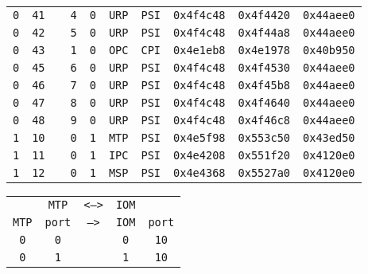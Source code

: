 \begin{adjustwidth}{5ex}{1ex}
\begin{tabular}{cccccccccc}
		\texttt{0} & \texttt{41} & & \texttt{4} & \texttt{0} & \texttt{URP} & \texttt{PSI} & \texttt{0x4f4c48} & \texttt{0x4f4420} & \texttt{0x44aee0} \\
		\texttt{0} & \texttt{42} & & \texttt{5} & \texttt{0} & \texttt{URP} & \texttt{PSI} & \texttt{0x4f4c48} & \texttt{0x4f44a8} & \texttt{0x44aee0} \\
		\texttt{0} & \texttt{43} & & \texttt{1} & \texttt{0} & \texttt{OPC} & \texttt{CPI} & \texttt{0x4e1eb8} & \texttt{0x4e1978} & \texttt{0x40b950} \\
		\texttt{0} & \texttt{45} & & \texttt{6} & \texttt{0} & \texttt{URP} & \texttt{PSI} & \texttt{0x4f4c48} & \texttt{0x4f4530} & \texttt{0x44aee0} \\
		\texttt{0} & \texttt{46} & & \texttt{7} & \texttt{0} & \texttt{URP} & \texttt{PSI} & \texttt{0x4f4c48} & \texttt{0x4f45b8} & \texttt{0x44aee0} \\
		\texttt{0} & \texttt{47} & & \texttt{8} & \texttt{0} & \texttt{URP} & \texttt{PSI} & \texttt{0x4f4c48} & \texttt{0x4f4640} & \texttt{0x44aee0} \\
		\texttt{0} & \texttt{48} & & \texttt{9} & \texttt{0} & \texttt{URP} & \texttt{PSI} & \texttt{0x4f4c48} & \texttt{0x4f46c8} & \texttt{0x44aee0} \\
        \texttt{1} & \texttt{10} & & \texttt{0} & \texttt{1} & \texttt{MTP} & \texttt{PSI} & \texttt{0x4e5f98} & \texttt{0x553c50} & \texttt{0x43ed50} \\
		\texttt{1} & \texttt{11} & & \texttt{0} & \texttt{1} & \texttt{IPC} & \texttt{PSI} & \texttt{0x4e4208} & \texttt{0x551f20} & \texttt{0x4120e0} \\
		\texttt{1} & \texttt{12} & & \texttt{0} & \texttt{1} & \texttt{MSP} & \texttt{PSI} & \texttt{0x4e4368} & \texttt{0x5527a0} & \texttt{0x4120e0} \\
	\end{tabular}
\end{adjustwidth}

\begin{adjustwidth}{5ex}{1ex}
	\begin{tabular}{ccccc}
		& \texttt{MTP} & \texttt{<-->} & \texttt{IOM} &  \\
		\texttt{MTP} & \texttt{port} & \texttt{-->} & \texttt{IOM} & \texttt{port} \\
		\texttt{0} & \texttt{0} & & \texttt{0} & \texttt{10} \\
		\texttt{0} & \texttt{1} & & \texttt{1} & \texttt{10} \\
	\end{tabular}
\end{adjustwidth}


